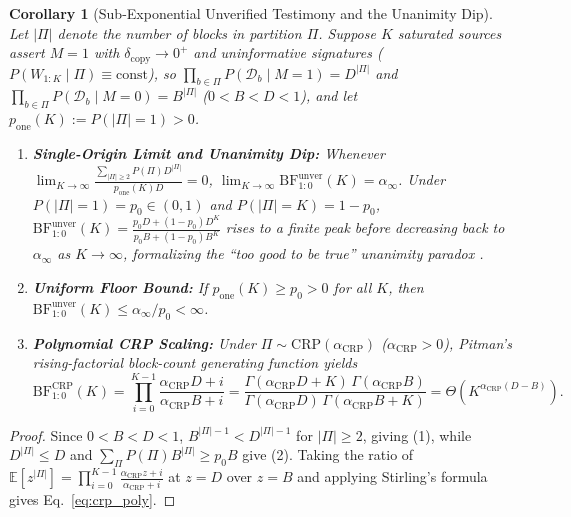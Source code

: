 \documentclass[11pt,a4paper]{article}
\newtheorem{corollary}{Corollary}
\theoremstyle{definition}
\theoremstyle{remark}
\newcommand{\E}{\mathbb{E}}
\newcommand{\BF}{\mathrm{BF}}
\begin{document}
\begin{corollary}[Sub-Exponential Unverified Testimony and the Unanimity Dip]
\label{cor:latent_prov}
Let $|\Pi|$ denote the number of blocks in partition $\Pi$. Suppose $K$ saturated sources assert $M=1$ with $\delta_{\mathrm{copy}} \to 0^+$ and uninformative signatures ($P(W_{1:K} \mid \Pi) \equiv \mathrm{const}$), so $\prod_{b \in \Pi} P(\mathcal{D}_b \mid M=1) = D^{|\Pi|}$ and $\prod_{b \in \Pi} P(\mathcal{D}_b \mid M=0) = B^{|\Pi|}$ ($0 < B < D < 1$), and let $p_{\mathrm{one}}(K) := P(|\Pi| = 1) > 0$.
\begin{enumerate}[nosep,leftmargin=1.8em]
  \item \textbf{Single-Origin Limit and Unanimity Dip:} Whenever $\lim_{K \to \infty} \frac{\sum_{|\Pi| \ge 2} P(\Pi) D^{|\Pi|}}{p_{\mathrm{one}}(K) D} = 0$, $\lim_{K \to \infty} \BF_{1:0}^{\mathrm{unver}}(K) = \alpha_\infty$. Under $P(|\Pi|=1) = p_0 \in (0,1)$ and $P(|\Pi|=K) = 1 - p_0$, $\BF_{1:0}^{\mathrm{unver}}(K) = \frac{p_0 D + (1-p_0)D^K}{p_0 B + (1-p_0)B^K}$ rises to a finite peak before decreasing back to $\alpha_\infty$ as $K \to \infty$, formalizing the ``too good to be true'' unanimity paradox \cite{bovens2003bayesian,olsson2005against,gunn2016too}.
  \item \textbf{Uniform Floor Bound:} If $p_{\mathrm{one}}(K) \ge p_0 > 0$ for all $K$, then $\BF_{1:0}^{\mathrm{unver}}(K) \le \alpha_\infty / p_0 < \infty$.
  \item \textbf{Polynomial CRP Scaling:} Under $\Pi \sim \mathrm{CRP}(\alpha_{\mathrm{CRP}})$ ($\alpha_{\mathrm{CRP}} > 0$), Pitman's rising-factorial block-count generating function \cite[Ch.~3]{pitman2006combinatorial} yields
  \begin{equation}
    \BF_{1:0}^{\mathrm{CRP}}(K) = \prod_{i=0}^{K-1} \frac{\alpha_{\mathrm{CRP}} D + i}{\alpha_{\mathrm{CRP}} B + i}
    = \frac{\Gamma(\alpha_{\mathrm{CRP}} D + K)\,\Gamma(\alpha_{\mathrm{CRP}} B)}{\Gamma(\alpha_{\mathrm{CRP}} D)\,\Gamma(\alpha_{\mathrm{CRP}} B + K)}
    = \Theta\!\left(K^{\alpha_{\mathrm{CRP}}(D - B)}\right).
    \label{eq:crp_poly}
  \end{equation}
\end{enumerate}
\end{corollary}

\begin{proof}
Since $0 < B < D < 1$, $B^{|\Pi|-1} < D^{|\Pi|-1}$ for $|\Pi| \ge 2$, giving (1), while $D^{|\Pi|} \le D$ and $\sum_\Pi P(\Pi) B^{|\Pi|} \ge p_0 B$ give (2). Taking the ratio of $\E[z^{|\Pi|}] = \prod_{i=0}^{K-1}\frac{\alpha_{\mathrm{CRP}} z + i}{\alpha_{\mathrm{CRP}} + i}$ \cite{pitman2006combinatorial} at $z=D$ over $z=B$ and applying Stirling's formula gives Eq.~\eqref{eq:crp_poly}.
\end{proof}
\end{document}
